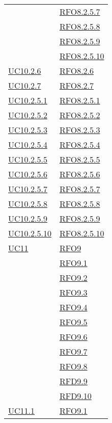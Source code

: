 \begin{longtable}{|>{\centering}m{5cm}|m{5cm}<{\centering}|}
& \hyperlink{RFO8.2.5.7}{RFO8.2.5.7}\\
& \hyperlink{RFO8.2.5.8}{RFO8.2.5.8}\\
& \hyperlink{RFO8.2.5.9}{RFO8.2.5.9}\\
& \hyperlink{RFO8.2.5.10}{RFO8.2.5.10}\\\hline
\hyperlink{UC10.2.6}{UC10.2.6} & \hyperlink{RFO8.2.6}{RFO8.2.6}\\\hline
\hyperlink{UC10.2.7}{UC10.2.7} & \hyperlink{RFO8.2.7}{RFO8.2.7}\\\hline
\hyperlink{UC10.2.5.1}{UC10.2.5.1} & \hyperlink{RFO8.2.5.1}{RFO8.2.5.1}\\\hline
\hyperlink{UC10.2.5.2}{UC10.2.5.2} & \hyperlink{RFO8.2.5.2}{RFO8.2.5.2}\\\hline
\hyperlink{UC10.2.5.3}{UC10.2.5.3} & \hyperlink{RFO8.2.5.3}{RFO8.2.5.3}\\\hline
\hyperlink{UC10.2.5.4}{UC10.2.5.4} & \hyperlink{RFO8.2.5.4}{RFO8.2.5.4}\\\hline
\hyperlink{UC10.2.5.5}{UC10.2.5.5} & \hyperlink{RFO8.2.5.5}{RFO8.2.5.5}\\\hline
\hyperlink{UC10.2.5.6}{UC10.2.5.6} & \hyperlink{RFO8.2.5.6}{RFO8.2.5.6}\\\hline
\hyperlink{UC10.2.5.7}{UC10.2.5.7} & \hyperlink{RFO8.2.5.7}{RFO8.2.5.7}\\\hline
\hyperlink{UC10.2.5.8}{UC10.2.5.8} & \hyperlink{RFO8.2.5.8}{RFO8.2.5.8}\\\hline
\hyperlink{UC10.2.5.9}{UC10.2.5.9} & \hyperlink{RFO8.2.5.9}{RFO8.2.5.9}\\\hline
\hyperlink{UC10.2.5.10}{UC10.2.5.10} & \hyperlink{RFO8.2.5.10}{RFO8.2.5.10}\\\hline
\hyperlink{UC11}{UC11} & \hyperlink{RFO9}{RFO9}\\\hline
& \hyperlink{RFO9.1}{RFO9.1}\\
& \hyperlink{RFO9.2}{RFO9.2}\\
& \hyperlink{RFO9.3}{RFO9.3}\\
& \hyperlink{RFO9.4}{RFO9.4}\\
& \hyperlink{RFO9.5}{RFO9.5}\\
& \hyperlink{RFO9.6}{RFO9.6}\\
& \hyperlink{RFO9.7}{RFO9.7}\\
& \hyperlink{RFO9.8}{RFO9.8}\\
& \hyperlink{RFD9.9}{RFD9.9}\\
& \hyperlink{RFD9.10}{RFD9.10}\\\hline
\hyperlink{UC11.1}{UC11.1} & \hyperlink{RFO9.1}{RFO9.1}\\\hline

\end{longtable}
